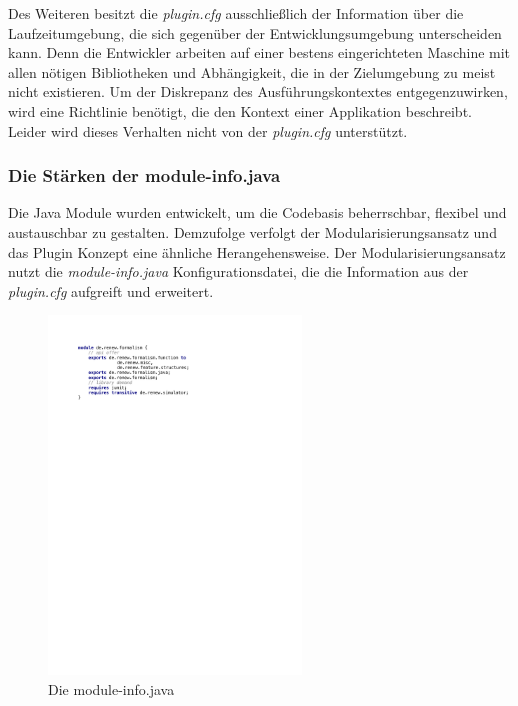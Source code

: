 			Des Weiteren besitzt die \textit{plugin.cfg} ausschließlich der Information über die Laufzeitumgebung, die sich gegenüber der Entwicklungsumgebung unterscheiden kann. Denn die Entwickler arbeiten auf einer bestens eingerichteten Maschine mit allen nötigen Bibliotheken und Abhängigkeit, die in der Zielumgebung zu meist nicht existieren. Um der Diskrepanz des Ausführungskontextes entgegenzuwirken, wird eine Richtlinie benötigt, die den Kontext einer Applikation beschreibt. Leider wird dieses Verhalten nicht von der \textit{plugin.cfg} unterstützt. 

		\subsubsection{Die Stärken der module-info.java} \label{sub:module-info.java}
			Die Java Module wurden entwickelt, um die Codebasis beherrschbar, flexibel und austauschbar zu gestalten. Demzufolge verfolgt der Modularisierungsansatz und das Plugin Konzept eine ähnliche Herangehensweise. Der Modularisierungsansatz nutzt die \textit{module-info.java} Konfigurationsdatei, die die Information aus der \textit{plugin.cfg} aufgreift und erweitert. \newline
			\begin{figure}[h!]
			  \centering
			  \includegraphics[width=0.6\textwidth]{material/images/m-info.pdf}
			  \caption{Die module-info.java}
			  \label{fig:module_info}
			\end{figure}

